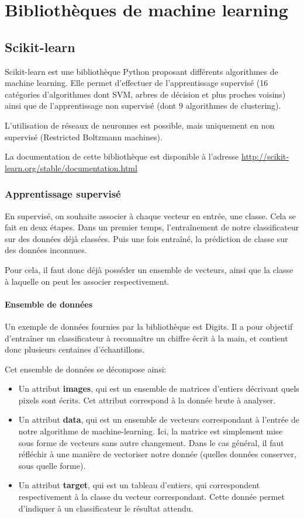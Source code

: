 \chapter{Bibliothèques de machine learning}

\section{Scikit-learn}
    
    Scikit-learn est une bibliothèque Python proposant différents algorithmes de machine learning. Elle permet d'effectuer de l'apprentissage supervisé (16 catégories d'algorithmes dont SVM, arbres de décision et plus proches voisins) ainsi que de l'apprentissage non supervisé (dont 9 algorithmes de clustering). 

L'utilisation de réseaux de neuronnes est possible, mais uniquement en non supervisé (Restricted Boltzmann machines).

La documentation de cette bibliothèque est disponible à l'adresse \url{http://scikit-learn.org/stable/documentation.html}

\subsection{Apprentissage supervisé}

En supervisé, on souhaite associer à chaque vecteur en entrée, une classe. Cela se fait en deux étapes. Dans un premier temps, l'entraînement de notre classificateur sur des données déjà classées. Puis une fois entraîné, la prédiction de classe sur des données inconnues.

Pour cela, il faut donc déjà posséder un ensemble de vecteurs, ainsi que la classe à laquelle on peut les associer respectivement.

\subsubsection{Ensemble de données}

Un exemple de données fournies par la bibliothèque est Digits. Il a pour objectif d'entraîner un classificateur à reconnaître un chiffre écrit à la main, et contient donc plusieurs centaines d'échantillons.

Cet ensemble de données se décompose ainsi:
\begin{itemize}
\item Un attribut \textbf{images}, qui est un ensemble de matrices d'entiers décrivant quels pixels sont écrits. Cet attribut correspond à la donnée brute à analyser.
\item Un attribut \textbf{data}, qui est un ensemble de vecteurs correspondant à l'entrée de notre algorithme de machine-learning. Ici, la matrice est simplement mise sous forme de vecteurs sans autre changement. Dans le cas général, il faut réfléchir à une manière de vectoriser notre donnée (quelles données conserver, sous quelle forme).
\item Un attribut \textbf{target}, qui est un tableau d'entiers, qui correspondent respectivement à la classe du vecteur correspondant. Cette donnée permet d'indiquer à un classificateur le résultat attendu.
\end{itemize}

